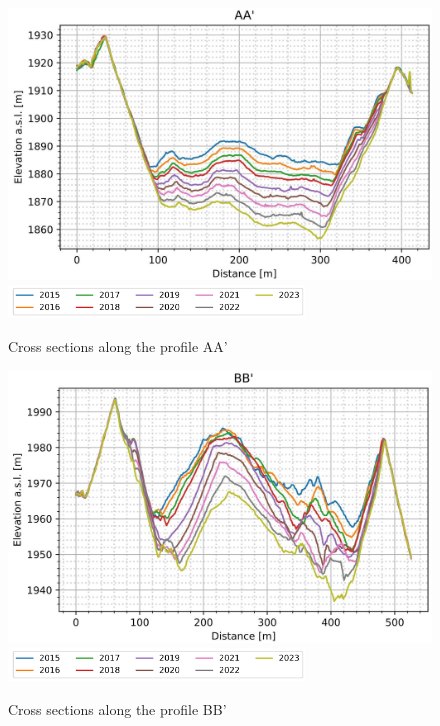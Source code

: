 \begin{figure}[p]
    \centering
    \includegraphics[width=\textwidth]{figures/appendix/profile_A.jpg}\\
    \includegraphics[width=0.7\textwidth]{figures/chapter3/profiles_legend.png}
    \caption{Cross sections along the profile AA'}
\end{figure}

\begin{figure}[p]
    \centering
    \includegraphics[width=\textwidth]{figures/appendix/profile_B.jpg}\\
    \includegraphics[width=0.7\textwidth]{figures/chapter3/profiles_legend.png}
    \caption{Cross sections along the profile BB'}
\end{figure}

